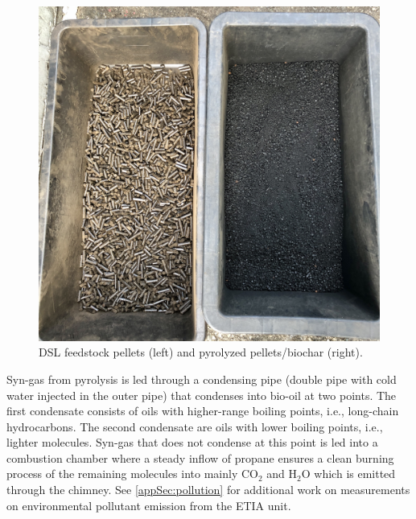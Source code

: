 \begin{figure}
    \centering
    \includegraphics[width=0.6\linewidth,scale=0.6]{Bilder/Pyrolysis/Pellets.png}
    \caption{DSL feedstock pellets (left) and pyrolyzed pellets/biochar (right).}
    \label{fig:pellets}
\end{figure}

Syn-gas from pyrolysis is led through a condensing pipe (double pipe with cold water injected in the outer pipe) that condenses into bio-oil at two points. The first condensate consists of oils with higher-range boiling points, i.e., long-chain hydrocarbons. The second condensate are oils with lower boiling points, i.e., lighter molecules. Syn-gas that does not condense at this point is led into a combustion chamber where a steady inflow of propane ensures a clean burning process of the remaining molecules into mainly $\mathrm{CO_2}$ and $\mathrm{H_2O}$ which is emitted through the chimney. See \cref{appSec:pollution} for additional work on measurements on environmental pollutant emission from the ETIA unit.

